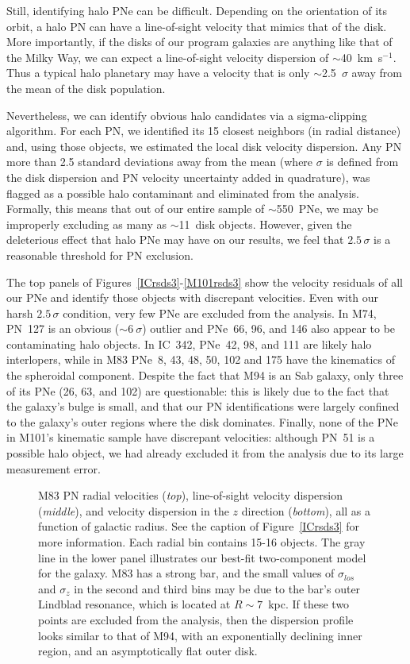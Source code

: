 \documentclass[12pt,preprint]{emulateapj}
\newcommand{\kms}{km~s$^{-1}$}
\begin{document}
Still, identifying halo PNe can be difficult.  Depending on the orientation of its orbit, a halo PN can have a line-of-sight velocity that mimics that of the disk.  More importantly, if the disks of our program galaxies are anything like that of the Milky Way, we can expect a line-of-sight velocity dispersion of $\sim$40~\kms.  Thus a typical halo planetary may have a velocity that is only $\sim$2.5~$\sigma$ away from the mean of the disk population.

Nevertheless, we can identify obvious halo candidates via a sigma-clipping algorithm.  For each PN, we identified its 15 closest neighbors (in radial distance) and, using those objects, we estimated the local disk velocity dispersion.   Any PN more than 2.5 standard deviations away from the mean (where $\sigma$ is defined from the disk dispersion and PN velocity uncertainty added in quadrature), was flagged as a possible halo contaminant and eliminated from the analysis.  Formally, this means that out of our entire sample of $\sim$550~PNe, we may be improperly excluding as many as $\sim$11~disk objects.  However, given the deleterious effect that halo PNe may have on our results, we feel that $2.5 \, \sigma$ is a reasonable threshold for PN exclusion.

The top panels of Figures~\ref{ICrsds3}-\ref{M101rsds3} show the velocity residuals of all our PNe and identify those objects with discrepant velocities.  Even with our harsh $2.5 \, \sigma$ condition, very few PNe are excluded from the analysis.  In M74, PN~127 is an obvious ($\sim$6$~\sigma$) outlier and PNe~66, 96, and 146 also appear to be contaminating halo objects.  In IC~342, PNe~42, 98, and 111 are likely halo interlopers, while in M83 PNe~8, 43, 48, 50, 102 and 175 have the kinematics of the spheroidal component.  Despite the fact that M94 is an Sab galaxy, only three of its PNe (26, 63, and 102) are questionable: this is likely due to the fact that the galaxy's bulge is small, and that our PN identifications were largely confined to the galaxy's outer regions where the disk dominates.  Finally, none of the PNe in M101's kinematic sample have discrepant velocities: although PN~51 is a possible halo object, we had already excluded it from the analysis due to its large measurement error.

\begin{figure}[t]
\caption{\scriptsize M83 PN radial velocities ({\it top}), line-of-sight velocity dispersion ({\it middle}), and velocity dispersion in the $z$ direction ({\it bottom}), all as a function of galactic radius.  See the caption of Figure~\ref{ICrsds3} for more information.  Each radial bin contains 15-16 objects.   The gray line in the lower panel illustrates our best-fit two-component model for the galaxy.  M83 has a strong bar, and the small values of $\sigma_{los}$ and $\sigma_z$ in the second and third bins may be due to the bar's outer Lindblad resonance, which is located at $R \sim 7$~kpc.  If these two points are excluded from the analysis, then the dispersion profile looks similar to that of M94, with an exponentially declining inner region, and an asymptotically flat outer disk. \label{M83rsds3} }
\end{figure}
\end{document}
